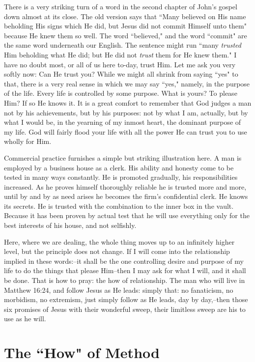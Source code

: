 There is a very striking turn of a word in the second chapter of John's
gospel down almost at its close. The old version says that ``Many believed
on His name beholding His signs which He did, but Jesus did not commit
Himself unto them" because He knew them so well. The word ``believed," and
the word ``commit" are the same word underneath our English. The sentence
might run ``many \textit{trusted} Him beholding what He did; but He did not
\textit{trust} them for He knew them." I have no doubt most, or all of us here
to-day, trust Him. Let me ask you very softly now: Can He trust you? While
we might all shrink from saying ``yes" to that, there is a very real sense
in which we may say ``yes," namely, in the purpose of the life. Every life
is controlled by some purpose. What is yours? To please Him? If so He
knows it. It is a great comfort to remember that God judges a man not by
his achievements, but by his purposes: not by what I am, actually, but by
what I would be, in the yearning of my inmost heart, the dominant purpose
of my life. God will fairly flood your life with all the power He can
trust you to use wholly for Him.

Commercial practice furnishes a simple but striking illustration here. A
man is employed by a business house as a clerk. His ability and honesty
come to be tested in many ways constantly. He is promoted gradually, his
responsibilities increased. As he proves himself thoroughly reliable he is
trusted more and more, until by and by as need arises he becomes the
firm's confidential clerk. He knows its secrets. He is trusted with the
combination to the inner box in the vault. Because it has been proven by
actual test that he will use everything only for the best interests of his
house, and not selfishly.

Here, where we are dealing, the whole thing moves up to an infinitely
higher level, but the principle does not change. If I will come into the
relationship implied in these words:--it shall be the one controlling
desire and purpose of my life to do the things that please Him--then I may
ask for what I will, and it shall be done. That is how to pray: the how of
relationship. The man who will live in Matthew 16:24, and follow Jesus as
He leads: simply that: no fanaticism, no morbidism, no extremism, just
simply follow as He leads, day by day,--then those six promises of Jesus
with their wonderful sweep, their limitless sweep are his to use as he
will.




\chapter{The ``How" of Method}



